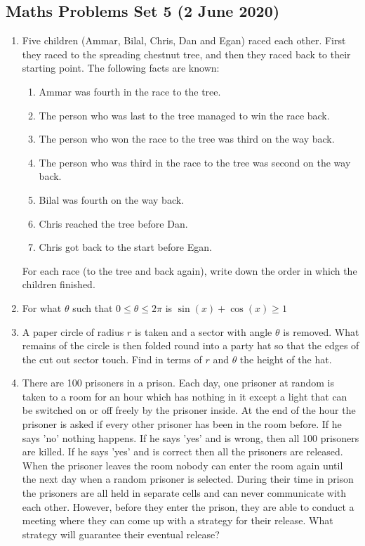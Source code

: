\documentclass[a4paper]{article}
\begin{document}
\begin{center}
        \section*{Maths Problems Set 5 (2 June 2020)}
\end{center}

\begin{enumerate}
	\item
	Five children (Ammar, Bilal, Chris, Dan and Egan) raced each other.  First they raced to the spreading chestnut tree, and then they raced back to their starting point. The following facts are known:
	\begin{enumerate}
		\item Ammar was fourth in the race to the tree.
		\item The person who was last to the tree managed to win the race back.
		\item The person who won the race to the tree was third on the way back.
		\item The person who was third in the race to the tree was second on the way back.
		\item Bilal was fourth on the way back.
		\item Chris reached the tree before Dan.
		\item Chris got back to the start before Egan.
	\end{enumerate}
	For  each  race  (to  the  tree  and  back  again),  write  down  the  order  in  which  the  children finished.

	\item
	For what $\theta$ such that $0 \leq \theta \leq 2\pi$ is $\sin(x) + \cos(x) \geq 1$

    \item
    A paper circle of radius $r$ is taken and a sector with angle $\theta$ is removed. What remains of the circle is then folded round into a party hat so that the edges of the cut out sector touch. Find in terms of $r$ and $\theta$ the height of the hat.

    \item
    There are 100 prisoners in a prison. Each day, one prisoner at random is taken to a room for an hour which has nothing in it except a light that can be switched on or off freely by the prisoner inside. At the end of the hour the prisoner is asked if every other prisoner has been in the room before. If he says 'no' nothing happens. If he says 'yes' and is wrong, then all 100 prisoners are killed. If he says 'yes' and is correct then all the prisoners are released. When the prisoner leaves the room nobody can enter the room again until the next day when a random prisoner is selected. During their time in prison the prisoners are all held in separate cells and can never communicate with each other. However, before they enter the prison, they are able to conduct a meeting where they can come up with a strategy for their release. What strategy will guarantee their eventual release?
    

\end{enumerate}
\end{document}
